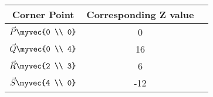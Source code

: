
\begin{center}
\begin{tabular}{|c|c|c|}
\hline
\textbf{Corner Point}& \textbf{Corresponding Z value} \\ \hline
$\vec{P}\myvec{0 \\ 0}$		 &	0\\ \hline
$\vec{Q}\myvec{0 \\ 4}$		 &	16\\ \hline
$\vec{R}\myvec{2 \\ 3}$		 &  6\\ \hline
$\vec{S}\myvec{4 \\ 0}$		 &  -12\\ \hline
\end{tabular}
\end{center}
